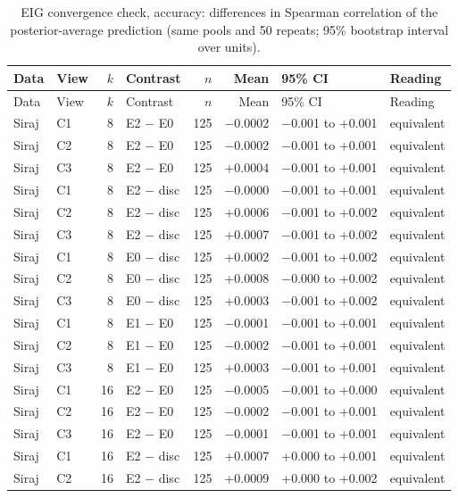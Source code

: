 {\small\begin{longtable}{llrlrrll}
\caption{EIG convergence check, accuracy: differences in Spearman correlation of the posterior-average prediction (same pools and 50 repeats; 95\% bootstrap interval over units).}\label{tab:s6b}\\
\toprule
Data & View & $k$ & Contrast & $n$ & Mean & 95\% CI & Reading \\
\midrule
\endfirsthead
\toprule
Data & View & $k$ & Contrast & $n$ & Mean & 95\% CI & Reading \\
\midrule
\endhead
Siraj & C1 & 8 & E2 $-$ E0 & 125 & $-$0.0002 & $-$0.001 to +0.001 & equivalent  \\
Siraj & C2 & 8 & E2 $-$ E0 & 125 & $-$0.0002 & $-$0.001 to +0.001 & equivalent  \\
Siraj & C3 & 8 & E2 $-$ E0 & 125 & +0.0004 & $-$0.001 to +0.001 & equivalent  \\
Siraj & C1 & 8 & E2 $-$ disc & 125 & $-$0.0000 & $-$0.001 to +0.001 & equivalent  \\
Siraj & C2 & 8 & E2 $-$ disc & 125 & +0.0006 & $-$0.001 to +0.002 & equivalent  \\
Siraj & C3 & 8 & E2 $-$ disc & 125 & +0.0007 & $-$0.001 to +0.002 & equivalent  \\
Siraj & C1 & 8 & E0 $-$ disc & 125 & +0.0002 & $-$0.001 to +0.002 & equivalent  \\
Siraj & C2 & 8 & E0 $-$ disc & 125 & +0.0008 & $-$0.000 to +0.002 & equivalent  \\
Siraj & C3 & 8 & E0 $-$ disc & 125 & +0.0003 & $-$0.001 to +0.002 & equivalent  \\
Siraj & C1 & 8 & E1 $-$ E0 & 125 & $-$0.0001 & $-$0.001 to +0.001 & equivalent  \\
Siraj & C2 & 8 & E1 $-$ E0 & 125 & $-$0.0002 & $-$0.001 to +0.001 & equivalent  \\
Siraj & C3 & 8 & E1 $-$ E0 & 125 & +0.0003 & $-$0.001 to +0.001 & equivalent  \\
Siraj & C1 & 16 & E2 $-$ E0 & 125 & $-$0.0005 & $-$0.001 to +0.000 & equivalent  \\
Siraj & C2 & 16 & E2 $-$ E0 & 125 & $-$0.0002 & $-$0.001 to +0.001 & equivalent  \\
Siraj & C3 & 16 & E2 $-$ E0 & 125 & $-$0.0001 & $-$0.001 to +0.001 & equivalent  \\
Siraj & C1 & 16 & E2 $-$ disc & 125 & +0.0007 & +0.000 to +0.001 & equivalent  \\
Siraj & C2 & 16 & E2 $-$ disc & 125 & +0.0009 & +0.000 to +0.002 & equivalent  \\

\end{longtable}}
